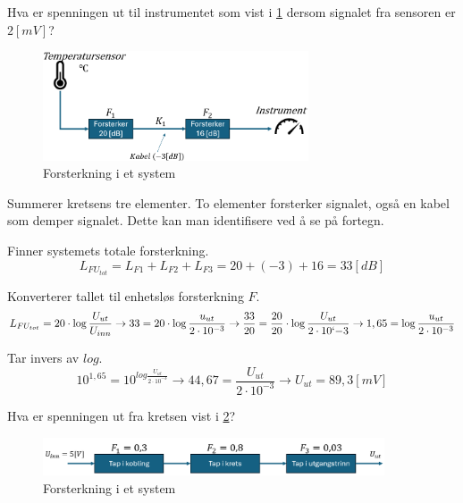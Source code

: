 \begin{question}[name=Oppgave, topic=forsterkning]
Hva er spenningen ut til instrumentet som vist i \ref{fig:forsterk3} dersom signalet fra sensoren er $2[mV]$?	

	\begin{figure}[H]
	\centering
	\includegraphics[width=0.7\textwidth]{forsterkning/figurer/forsterkning2.png}
	\caption{Forsterkning i et system}
	\label{fig:forsterk3}
\end{figure}
\end{question}

\vspace{0.5cm} %

\begin{solution}[name=Løsningsforslag oppgave]
Summerer kretsens tre elementer. To elementer forsterker signalet, også en kabel som demper signalet. Dette kan man identifisere ved å se på fortegn.

Finner systemets totale forsterkning.
\[L_{FU_{tot}}=L_{F1}+L_{F2}+L_{F3}=20+(-3)+16= 33 [dB]\]

Konverterer tallet til enhetsløs forsterkning $F$.
\[L_{FU_{tot}} = 20 \cdot \log \frac{U_{ut}}{U_{inn}} \rightarrow 33=20 \cdot \log \frac{u_{ut}}{2 \cdot 10^{-3}} \rightarrow \frac{33}{20}=\frac{20}{20} \cdot \log \frac{U_{ut}}{2 \cdot 10`{-3}} \rightarrow 1,65 = \log \frac{u_{ut}}{2 \cdot 10^{-3}}\]

Tar invers av $log$.
\[10^{1,65} = 10^{log \frac{U_{ut}}{2 \cdot 10^{-3}}} \rightarrow 44,67 = \frac{U_{ut}}{2 \cdot 10^{-3}} \rightarrow U_{ut}=89,3[mV]\]
\end{solution}

\vspace{0.5cm} %

\begin{question}[name=Oppgave, topic=forsterkning]
Hva er spenningen ut fra kretsen vist i \ref{fig:forsterk4}?
	
	\begin{figure}[H]
		\centering
		\includegraphics[width=0.9\textwidth]{forsterkning/figurer/forsterkning3.png}
		\caption{Forsterkning i et system}
		\label{fig:forsterk4}
	\end{figure}
\end{question}

